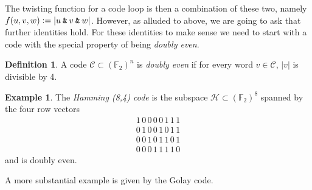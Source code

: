 \documentclass{article}
\theoremstyle{plain}
\theoremstyle{definition}
\newtheorem*{definition}{Definition}
\newtheorem{example}{Example}
\def \cC {\mathcal{C}}
\def \FF {\mathbb{F}}
\newcommand{\AND}{\mathbin{\textup{\texttt{\&}}}}
\begin{document}
The twisting function for a code loop is then a combination of these two, namely $f(u,v,w) := |u\AND v\AND w|$.
However, as alluded to above, we are going to ask that further identities hold. 
For these identities to make sense we need to start with a code with the special property of being \emph{doubly even}.

\begin{definition}
A code $\cC \subset (\FF_2)^n$ is \emph{doubly even} if for every word $v\in \cC$, $|v|$ is divisible by 4. 
\end{definition}


\begin{example}\label{example:Hamming}
The \emph{Hamming (8,4) code} is the subspace $\mathcal{H} \subset (\FF_2)^8$ spanned by the four row vectors
\[
\begin{array}{c}
1\,0\,0\,0\,0\,1\,1\,1\\
0\,1\,0\,0\,1\,0\,1\,1\\
0\,0\,1\,0\,1\,1\,0\,1\\
0\,0\,0\,1\,1\,1\,1\,0
\end{array}
\]
and is doubly even.
\end{example}

A more substantial example is given by the Golay code.
\end{document}
